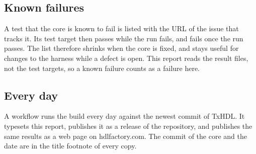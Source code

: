 \subsection{Known failures}

A test that the core is known to fail is listed with the URL of the
issue that tracks it. Its test target then passes while the run fails,
and fails once the run passes. The list therefore shrinks when the
core is fixed, and  stays useful for changes to the
harness while a defect is open. This report reads the result files,
not the test targets, so a known failure counts as a failure here.

\subsection{Every day}

A workflow runs the build every day against the newest commit of
TxHDL. It typesets this report, publishes it as a release of the
repository, and publishes the same results as a web page on
hdlfactory.com. The commit of the core and the date are in the title
footnote of every copy.
